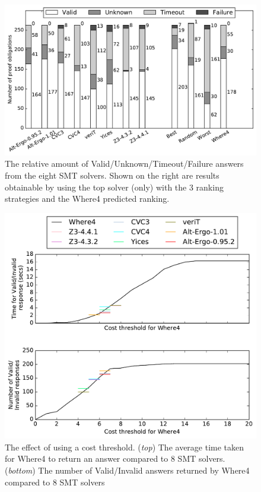\documentclass[runningheads,a4paper]{llncs}
\begin{document}
\begin{figure}
\centering
\includegraphics[width=0.9\linewidth]{barcharts2}
\caption{The relative amount of Valid/Unknown/Timeout/Failure answers from the eight SMT solvers. Shown on the right are results obtainable by using the top solver (only) with the 3 ranking strategies and the \textsf{Where4} predicted ranking.}
\label{fig:barchart2}
\end{figure}

\begin{figure}
\centering
\includegraphics[width=0.8\linewidth]{thresholds}
\caption{The effect of using a cost threshold. (\textit{top}) The average time taken for \textsf{Where4} to return an answer compared to 8 SMT solvers. (\textit{bottom}) The number of Valid/Invalid answers returned by \textsf{Where4} compared to 8 SMT solvers}
\label{fig:thresholds}
\end{figure}
\end{document}
